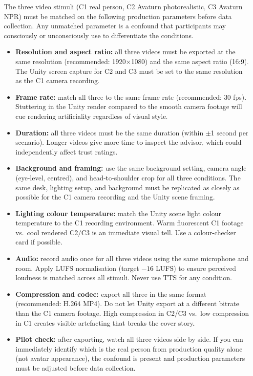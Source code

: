 \documentclass[11pt, a4paper]{article}
\begin{document}
\begin{infobox}
\small The three video stimuli (C1 real person, C2 Avaturn photorealistic, C3 Avaturn NPR) must be matched on the following production parameters before data collection. Any unmatched parameter is a confound that participants may consciously or unconsciously use to differentiate the conditions.

\begin{itemize}[topsep=2pt, itemsep=3pt]
  \item \textbf{Resolution and aspect ratio:} all three videos must be exported at the same resolution (recommended: 1920×1080) and the same aspect ratio (16:9). The Unity screen capture for C2 and C3 must be set to the same resolution as the C1 camera recording.
  \item \textbf{Frame rate:} match all three to the same frame rate (recommended: 30 fps). Stuttering in the Unity render compared to the smooth camera footage will cue rendering artificiality regardless of visual style.
  \item \textbf{Duration:} all three videos must be the same duration (within $\pm$1 second per scenario). Longer videos give more time to inspect the advisor, which could independently affect trust ratings.
  \item \textbf{Background and framing:} use the same background setting, camera angle (eye-level, centred), and head-to-shoulder crop for all three conditions. The same desk, lighting setup, and background must be replicated as closely as possible for the C1 camera recording and the Unity scene framing.
  \item \textbf{Lighting colour temperature:} match the Unity scene light colour temperature to the C1 recording environment. Warm fluorescent C1 footage vs.\ cool rendered C2/C3 is an immediate visual tell. Use a colour-checker card if possible.
  \item \textbf{Audio:} record audio once for all three videos using the same microphone and room. Apply LUFS normalisation (target $-16$ LUFS) to ensure perceived loudness is matched across all stimuli. Never use TTS for any condition.
  \item \textbf{Compression and codec:} export all three in the same format (recommended: H.264 MP4). Do not let Unity export at a different bitrate than the C1 camera footage. High compression in C2/C3 vs.\ low compression in C1 creates visible artefacting that breaks the cover story.
  \item \textbf{Pilot check:} after exporting, watch all three videos side by side. If you can immediately identify which is the real person from production quality alone (not avatar appearance), the confound is present and production parameters must be adjusted before data collection.
\end{itemize}
\end{infobox}
\end{document}
